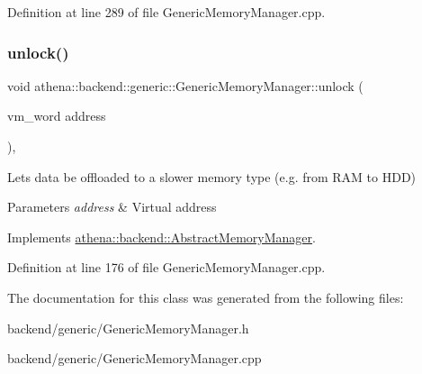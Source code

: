 Definition at line 289 of file Generic\+Memory\+Manager.\+cpp.

\mbox{\label{classathena_1_1backend_1_1generic_1_1_generic_memory_manager_a58a2b56a07a96c3cabb7b8fd079b3eae}} 
\subsubsection{\texorpdfstring{unlock()}{unlock()}}
{\footnotesize\ttfamily void athena\+::backend\+::generic\+::\+Generic\+Memory\+Manager\+::unlock (\begin{DoxyParamCaption}\item[{vm\+\_\+word}]{address }\end{DoxyParamCaption})\hspace{0.3cm}{\ttfamily [override]}, {\ttfamily [virtual]}}

Lets data be offloaded to a slower memory type (e.\+g. from R\+AM to H\+DD) 
\begin{DoxyParams}{Parameters}
{\em address} & Virtual address \\
\hline
\end{DoxyParams}


Implements \mbox{\hyperlink{classathena_1_1backend_1_1_abstract_memory_manager_aec859ee3bf6011d8710b2ec4bfc2373e}{athena\+::backend\+::\+Abstract\+Memory\+Manager}}.



Definition at line 176 of file Generic\+Memory\+Manager.\+cpp.



The documentation for this class was generated from the following files\+:\begin{DoxyCompactItemize}
\item 
backend/generic/Generic\+Memory\+Manager.\+h\item 
backend/generic/Generic\+Memory\+Manager.\+cpp\end{DoxyCompactItemize}
